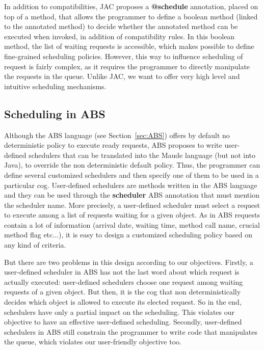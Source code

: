 \documentclass[11pt]{report}
\begin{document}
In addition to compatibilities, JAC proposes a \textbf{@schedule} annotation, placed on top of a method, that allows the programmer to define a boolean method (linked to the annotated method) to decide whether the annotated method can be executed when invoked, in addition of compatibility rules. In this boolean method, the list of waiting requests is accessible, which makes possible to define fine-grained scheduling policies.
However, this way to influence scheduling of request is fairly complex, as it requires the programmer to directly manipulate the requests in the queue. Unlike JAC, we want to offer very high level and intuitive scheduling mechanisms.


\subsection{Scheduling in ABS}
Although the ABS language (see Section~\ref{sec:ABS}) offers by default no deterministic policy to execute ready requests, ABS proposes to write user-defined schedulers that can be translated into the Maude language (but not into Java), to override the non deterministic default policy. Thus, the programmer can define several customized schedulers and then specify one of them to be used in a particular cog. User-defined schedulers are methods written in the ABS language and they can be used through the \textbf{scheduler} ABS annotation that must mention the scheduler name. More precisely, a user-defined scheduler must select a request to execute among a list of requests waiting for a given object. As in ABS requests contain a lot of information (arrival date, waiting time, method call name, crucial method flag etc...), it is easy to design a customized scheduling policy based on any kind of criteria. 

But there are two problems in this design according to our objectives. Firstly, a user-defined scheduler in ABS has not the last word about which request is actually executed: user-defined schedulers choose one request among waiting requests of a given object. But then, it is the cog that non deterministically decides which object is allowed to execute its elected request. So in the end, schedulers have only a partial impact on the scheduling. This violates our objective to have an effective user-defined scheduling. Secondly, user-defined schedulers in ABS still constrain the programmer to write code that manipulates the queue, which violates our user-friendly objective too.
\end{document}
